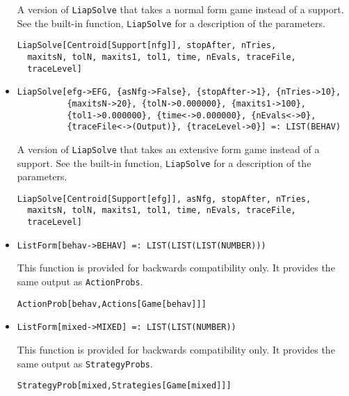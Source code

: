 \begin{itemize}
\bd 
A version of \verb+LiapSolve+ that takes a normal form
game instead of a support.  See the built-in function,
\verb+LiapSolve+ for a description of the parameters.
\begin{verbatim}
LiapSolve[Centroid[Support[nfg]], stopAfter, nTries,
  maxitsN, tolN, maxits1, tol1, time, nEvals, traceFile,
  traceLevel]
\end{verbatim} 
\ed

\item{}
\protect \large \begin{verbatim}
LiapSolve[efg->EFG, {asNfg->False}, {stopAfter->1}, {nTries->10}, 
          {maxitsN->20}, {tolN->0.000000}, {maxits1->100}, 
          {tol1->0.000000}, {time<->0.000000}, {nEvals<->0}, 
          {traceFile<->(Output)}, {traceLevel->0}] =: LIST(BEHAV) 
\end{verbatim}\normalsize

\bd 
A version of \verb+LiapSolve+ that takes an extensive form
game instead of a support.  See the built-in function,
\verb+LiapSolve+ for a description of the parameters.
\begin{verbatim}
LiapSolve[Centroid[Support[efg]], asNfg, stopAfter, nTries,
  maxitsN, tolN, maxits1, tol1, time, nEvals, traceFile,
  traceLevel]
\end{verbatim} 
\ed

\item{}
\protect \large \begin{verbatim}
ListForm[behav->BEHAV] =: LIST(LIST(LIST(NUMBER))) 
\end{verbatim}\normalsize

\bd 
This function is provided for backwards compatibility only.  It
provides the same output as \verb+ActionProbs+.
\begin{verbatim}
ActionProb[behav,Actions[Game[behav]]]
\end{verbatim} 
\ed

\item{}
\protect \large \begin{verbatim}
ListForm[mixed->MIXED] =: LIST(LIST(NUMBER)) 
\end{verbatim}\normalsize

\bd 
This function is provided for backwards compatibility only.  It
provides the same output as \verb+StrategyProbs+.
\begin{verbatim}
StrategyProb[mixed,Strategies[Game[mixed]]]
\end{verbatim} 
\ed


\end{itemize}
